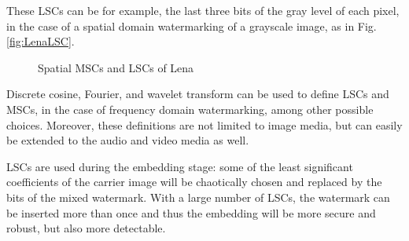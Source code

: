 These LSCs can be for example, the last three bits of the gray level of each pixel, 
in the case of a spatial domain watermarking of a grayscale image, as in Fig.\ref{fig:LenaLSC}.
\begin{figure}[h!]
\centering
{} \hspace{0.5cm}
 \hspace{0.5cm}
 \hspace{0.5cm}
\caption{Spatial MSCs and LSCs of Lena}
\label{Spatial MSCs and LSCs of Lena}
\end{figure}

Discrete cosine, Fourier, and wavelet transform can be used to define LSCs
and MSCs, in the case of frequency domain watermarking, among other possible choices. 
Moreover, these definitions are not limited to image media, but can easily be extended to the audio and video media as well.

LSCs are used during the embedding stage: some of the least significant
coefficients of the carrier image will be chaotically chosen and replaced by the bits of the mixed watermark. 
With a large number of LSCs,
the watermark can be inserted more than once and thus the embedding will
be more secure and robust, but also more detectable.

